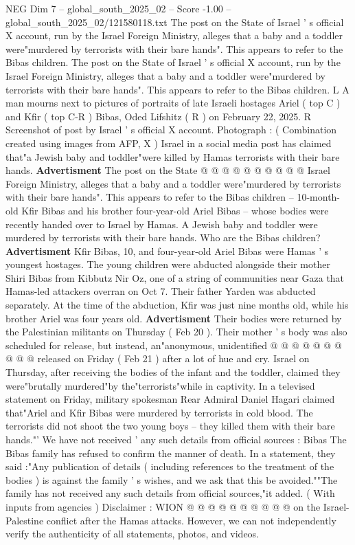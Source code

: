 \begin{textsample}{NEG Dim 7 – global\_south\_2025\_02 – Score -1.00 – global\_south\_2025\_02/121580118.txt}  \label{ex:f7_neg_037}
The post on the State of Israel ' s official X account, run by the Israel Foreign Ministry, alleges that a baby and a toddler were"murdered by terrorists with their bare hands".
This appears to refer to the Bibas children.
The post on the State of Israel ' s official X account, run by the Israel Foreign Ministry, alleges that a baby and a toddler were"murdered by terrorists with their bare hands".
This appears to refer to the Bibas children.
L A man mourns next to pictures of portraits of late Israeli hostages Ariel ( top C ) and Kfir ( top C-R ) Bibas, Oded Lifshitz ( R ) on February 22, 2025.
R Screenshot of post by Israel ' s official X account.
Photograph : ( Combination created using images from AFP, X ) Israel in a social media post has claimed that"a Jewish baby and toddler"were killed by Hamas terrorists with their bare hands. \textbf{Advertisment} The post on the State @ @ @ @ @ @ @ @ @ @ Israel Foreign Ministry, alleges that a baby and a toddler were"murdered by terrorists with their bare hands".
This appears to refer to the Bibas children -- 10-month-old Kfir Bibas and his brother four-year-old Ariel Bibas -- whose bodies were recently handed over to Israel by Hamas.
A Jewish baby and toddler were murdered by terrorists with their bare hands.
Who are the Bibas children? \textbf{Advertisment} Kfir Bibas, 10, and four-year-old Ariel Bibas were Hamas ' s youngest hostages.
The young children were abducted alongside their mother Shiri Bibas from Kibbutz Nir Oz, one of a string of communities near Gaza that Hamas-led attackers overran on Oct 7.
Their father Yarden was abducted separately.
At the time of the abduction, Kfir was just nine months old, while his brother Ariel was four years old. \textbf{Advertisment} Their bodies were returned by the Palestinian militants on Thursday ( Feb 20 ).
Their mother ' s body was also scheduled for release, but instead, an"anonymous, unidentified @ @ @ @ @ @ @ @ @ @ released on Friday ( Feb 21 ) after a lot of hue and cry.
Israel on Thursday, after receiving the bodies of the infant and the toddler, claimed they were"brutally murdered"by the"terrorists"while in captivity.
In a televised statement on Friday, military spokesman Rear Admiral Daniel Hagari claimed that"Ariel and Kfir Bibas were murdered by terrorists in cold blood.
The terrorists did not shoot the two young boys -- they killed them with their bare hands."' We have not received ' any such details from official sources : Bibas The Bibas family has refused to confirm the manner of death.
In a statement, they said :"Any publication of details ( including references to the treatment of the bodies ) is against the family ' s wishes, and we ask that this be avoided.""The family has not received any such details from official sources,"it added. ( With inputs from agencies ) Disclaimer : WION @ @ @ @ @ @ @ @ @ @ on the Israel-Palestine conflict after the Hamas attacks.
However, we can not independently verify the authenticity of all statements, photos, and videos.

\end{textsample}
